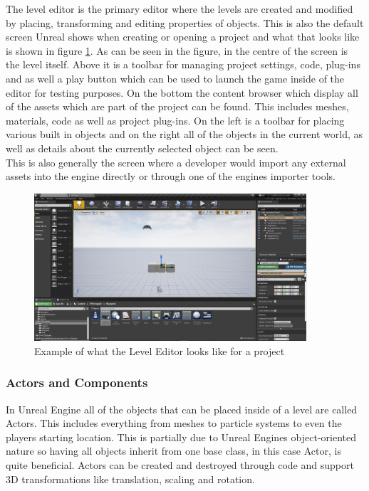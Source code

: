 The level editor is the primary editor where the levels are created and modified by placing, transforming and editing properties of objects. This is also the default screen Unreal shows when creating or opening a project and what that looks like is shown in figure \ref{fig:LevelEditor}. As can be seen in the figure, in the centre of the screen is the level itself. Above it is a toolbar for managing project settings, code, plug-ins and as well a play button which can be used to launch the game inside of the editor for testing purposes. On the bottom the content browser which display all of the assets which are part of the project can be found. This includes meshes, materials, code as well as project plug-ins. On the left is a toolbar for placing various built in objects and on the right all of the objects in the current world, as well as details about the currently selected object can be seen.\\
This is also generally the screen where a developer would import any external assets into the engine directly or through one of the engines importer tools.\\

\begin{figure}[htpb]
	\centering
	\includegraphics[width=0.9\textwidth]{fig/UnrealEngineLevelEditor.png}
	\caption[Unreal Engine Level Editor]{Example of what the Level Editor looks like for a project \protect}
	\label{fig:LevelEditor}
\end{figure}

\subsubsection{Actors and Components}

In Unreal Engine all of the objects that can be placed inside of a level are called Actors. This includes everything from meshes to particle systems to even the players starting location. This is partially due to Unreal Engines object-oriented nature so having all objects inherit from one base class, in this case Actor, is quite beneficial. Actors can be created and destroyed through code and support 3D transformations like translation, scaling and rotation.\\

